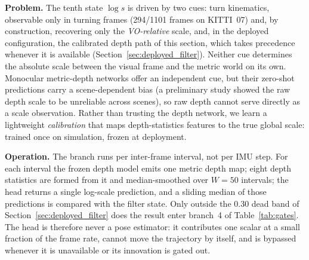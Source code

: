 \textbf{Problem.} The tenth state $\log s$ is driven by two cues: turn kinematics, observable only in turning frames (294/1101 frames on KITTI~07) and, by construction, recovering only the \emph{VO-relative} scale, and, in the deployed configuration, the calibrated depth path of this section, which takes precedence whenever it is available (Section~\ref{sec:deployed_filter}). Neither cue determines the absolute scale between the visual frame and the metric world on its own. Monocular metric-depth networks offer an independent cue, but their zero-shot predictions carry a scene-dependent bias (a preliminary study showed the raw depth scale to be unreliable across scenes), so raw depth cannot serve directly as a scale observation. Rather than trusting the depth network, we learn a lightweight \emph{calibration} that maps depth-statistics features to the true global scale: trained once on simulation, frozen at deployment.

\textbf{Operation.} The branch runs per inter-frame interval, not per IMU step. For each interval the frozen depth model emits one metric depth map; eight depth statistics are formed from it and median-smoothed over $W{=}50$ intervals; the head returns a single log-scale prediction, and a sliding median of those predictions is compared with the filter state. Only outside the 0.30 dead band of Section~\ref{sec:deployed_filter} does the result enter branch~4 of Table~\ref{tab:gates}. The head is therefore never a pose estimator: it contributes one scalar at a small fraction of the frame rate, cannot move the trajectory by itself, and is bypassed whenever it is unavailable or its innovation is gated out.

